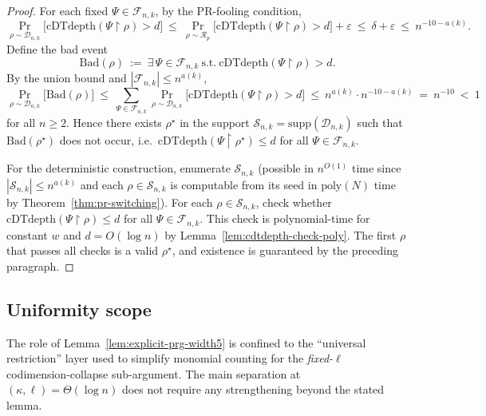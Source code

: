 \documentclass[12pt]{article}
\theoremstyle{definition}
\theoremstyle{definition}
\theoremstyle{remark}
\theoremstyle{remark}
\begin{document}
\begin{proof}
For each fixed $\Psi\in\mathcal{F}_{n,k}$, by the PR-fooling condition,
\[
\Pr_{\rho\sim \mathcal{D}_{n,k}}\!\big[\mathrm{cDTdepth}(\Psi\!\upharpoonright\!\rho)>d\big]
\ \le\
\Pr_{\rho\sim \mathcal{R}_{p}}\!\big[\mathrm{cDTdepth}(\Psi\!\upharpoonright\!\rho)>d\big]
+\varepsilon
\ \le\ \delta+\varepsilon
\ \le\ n^{-10-a(k)}.
\]
Define the bad event
\[
\mathrm{Bad}(\rho)\ :=\ \exists\,\Psi\in\mathcal{F}_{n,k}\ \text{s.t.}\
\mathrm{cDTdepth}(\Psi\!\upharpoonright\!\rho)>d.
\]
By the union bound and $|\mathcal{F}_{n,k}|\le n^{a(k)}$,
\[
\Pr_{\rho\sim \mathcal{D}_{n,k}}\!\big[\mathrm{Bad}(\rho)\big]
\ \le\
\sum_{\Psi\in\mathcal{F}_{n,k}}
\Pr_{\rho\sim \mathcal{D}_{n,k}}\!\big[\mathrm{cDTdepth}(\Psi\!\upharpoonright\!\rho)>d\big]
\ \le\
n^{a(k)}\cdot n^{-10-a(k)}
\ =\ n^{-10}
\ <\ 1
\]
for all $n\ge 2$. Hence there exists $\rho^\star$ in the support
$\mathcal{S}_{n,k}=\mathrm{supp}(\mathcal{D}_{n,k})$ such that $\mathrm{Bad}(\rho^\star)$ does not occur,
i.e.\ $\mathrm{cDTdepth}(\Psi\!\upharpoonright\!\rho^\star)\le d$ for all $\Psi\in\mathcal{F}_{n,k}$.

For the deterministic construction, enumerate $\mathcal{S}_{n,k}$ (possible in $n^{O(1)}$ time since $|\mathcal{S}_{n,k}|\le n^{a(k)}$ and each $\rho\in\mathcal{S}_{n,k}$ is computable from its seed in $\mathrm{poly}(N)$ time by Theorem~\ref{thm:pr-switching}).
For each $\rho\in\mathcal{S}_{n,k}$, check whether
$\mathrm{cDTdepth}(\Psi\!\upharpoonright\!\rho)\le d$ for all $\Psi\in\mathcal{F}_{n,k}$.
This check is polynomial-time for constant $w$ and $d=O(\log n)$ by
Lemma~\ref{lem:cdtdepth-check-poly}. The first $\rho$ that passes all checks is a valid $\rho^\star$,
and existence is guaranteed by the preceding paragraph.
\end{proof}


\subsection{Uniformity scope}
\label{subsec:uniformity-scope}
The role of Lemma~\ref{lem:explicit-prg-width5} is confined to the ``universal restriction''
layer used to simplify monomial counting for the \emph{fixed-$\ell$} codimension-collapse
sub-argument. The main separation at $(\kappa,\ell)=\Theta(\log n)$ does not require
any strengthening beyond the stated lemma.

\end{document}
